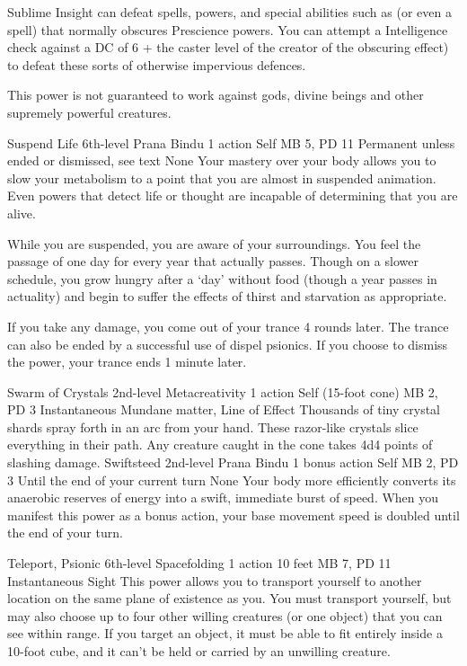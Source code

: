 Sublime Insight can defeat spells,
powers,
and special abilities such as 
(or even a  spell)
that normally obscures Prescience powers.
You can attempt a Intelligence check against
a DC of 6 + the caster level of the
creator of the obscuring effect)
to defeat these sorts of otherwise impervious defences.

This power is not guaranteed to work against gods, divine beings
and other supremely powerful creatures.

\DndPowerHeader%
    {Suspend Life\label{pwr:suspend-life}}
    {6th-level Prana Bindu}
    {1 action}
    {Self}
    {MB 5, PD 11}
    {Permanent unless ended or dismissed, see text}
    {None}
Your mastery over your body allows you to
slow your metabolism to a point that you are almost in suspended
animation. Even powers that detect life or thought are incapable
of determining that you are alive.

While you are suspended, you are aware of your surroundings.
You feel the passage of one day for every year that actually
passes. Though on a slower schedule, you grow hungry after
a `day' without food (though a year passes in actuality)
and begin to suffer the effects of thirst and starvation as
appropriate.

If you take any damage, you come out of your trance 4 rounds
later. The trance can also be ended by a successful use of
dispel psionics. If you choose to dismiss the power, your
trance ends 1 minute later.

\DndPowerHeader%
    {Swarm of Crystals\label{pwr:swarm-of-crystals}}
    {2nd-level Metacreativity}
    {1 action}
    {Self (15-foot cone)}
    {MB 2, PD 3}
    {Instantaneous}
    {Mundane matter, Line of Effect}
Thousands of tiny crystal shards spray forth
in an arc from your hand. These razor-like crystals slice
everything in their path. Any creature caught in the cone
takes 4d4 points of slashing damage.
\DndPowerHeader%
    {Swiftsteed\label{pwr:swiftsteed}}
    {2nd-level Prana Bindu}
    {1 bonus action}
    {Self}
    {MB 2, PD 3}
    {Until the end of your current turn}
    {None}
Your body more efficiently converts its anaerobic
reserves of energy into a swift, immediate burst of speed.
When you manifest this power as a bonus action, your base
movement speed is doubled until the end of your turn.

\DndPowerHeader%
    {Teleport, Psionic\label{pwr:teleport-psionic}}
    {6th-level Spacefolding}
    {1 action}
    {10 feet}
    {MB 7, PD 11}
    {Instantaneous}
    {Sight}
This power allows you to transport yourself to another location
on the same plane of existence as you.
You must transport yourself,
but may also choose up to four other willing creatures (or one object)
that you can see within range.
If you target an object, it must be able to fit entirely inside
a 10-foot cube, and it can't be held or carried by an unwilling creature.

